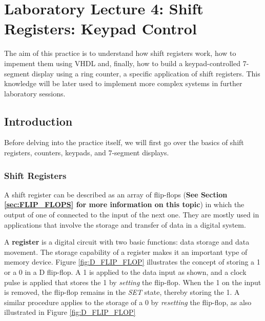 \section{Laboratory Lecture 4: Shift Registers: Keypad Control}

The aim of this practice is to understand how shift registers work, how to impement them using VHDL and, finally, how to build a keypad-controlled 7-segment display using a ring counter, a specific application of shift registers. This knowledge will be later used to implement more complex systems in further laboratory sessions. 

\subsection{Introduction}

Before delving into the practice itself, we will first go over the basics of shift registers, counters, keypads, and 7-segment displays.

\subsubsection{Shift Registers}

A shift register can be described as an array of flip-flops (\textbf{See Section \ref{sec:FLIP_FLOPS} for more information on this topic}) in which the output of one of connected to the input of the next one. They are mostly used in applications that involve the storage and transfer of data in a digital system.\medskip

A \textbf{register} is a digital circuit with two basic functions: data storage and data movement.
The storage capability of a register makes it an important type of memory device. Figure \ref{fig:D_FLIP_FLOP} illustrates the concept of storing a 1 or a 0 in a D flip-flop. A 1 is applied to the data input as shown, and a clock pulse is applied that stores the 1 by \textit{setting} the flip-flop. When the 1 on the input is removed, the flip-flop remains in the \textit{SET} state, thereby storing the 1. A similar procedure applies to the storage of a 0 by \textit{resetting} the flip-flop, as also illustrated in Figure \ref{fig:D_FLIP_FLOP} ~\autocite{FLOYD}

